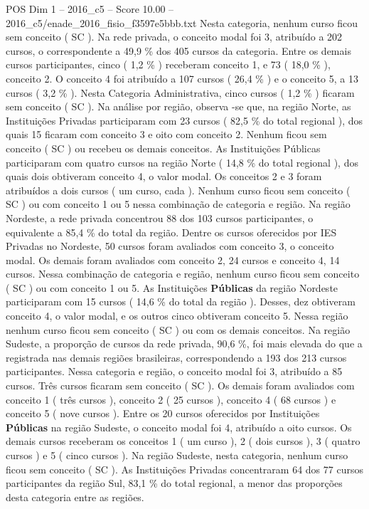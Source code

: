 \begin{textsample}{POS Dim 1 – 2016\_c5 – Score 10.00 – 2016\_c5/enade\_2016\_fisio\_f3597e5bbb.txt}
Nesta categoria, nenhum curso ficou sem conceito ( SC ).
Na rede privada, o conceito modal foi 3, atribuído a 202 cursos, o correspondente a 49,9 \% dos 405 cursos da categoria.
Entre os demais cursos participantes, cinco ( 1,2 \% ) receberam conceito 1, e 73 ( 18,0 \% ), conceito 2.
O conceito 4 foi atribuído a 107 cursos ( 26,4 \% ) e o conceito 5, a 13 cursos ( 3,2 \% ).
Nesta Categoria Administrativa, cinco cursos ( 1,2 \% ) ficaram sem conceito ( SC ).
Na análise por região, observa -se que, na região Norte, as Instituições Privadas participaram com 23 cursos ( 82,5 \% do total regional ), dos quais 15 ficaram com conceito 3 e oito com conceito 2.
Nenhum ficou sem conceito ( SC ) ou recebeu os demais conceitos.
As Instituições Públicas participaram com quatro cursos na região Norte ( 14,8 \% do total regional ), dos quais dois obtiveram conceito 4, o valor modal.
Os conceitos 2 e 3 foram atribuídos a dois cursos ( um curso, cada ).
Nenhum curso ficou sem conceito ( SC ) ou com conceito 1 ou 5 nessa combinação de categoria e região.
Na região Nordeste, a rede privada concentrou 88 dos 103 cursos participantes, o equivalente a 85,4 \% do total da região.
Dentre os cursos oferecidos por IES Privadas no Nordeste, 50 cursos foram avaliados com conceito 3, o conceito modal.
Os demais foram avaliados com conceito 2, 24 cursos e conceito 4, 14 cursos.
Nessa combinação de categoria e região, nenhum curso ficou sem conceito ( SC ) ou com conceito 1 ou 5.
As Instituições \textbf{Públicas} da região Nordeste participaram com 15 cursos ( 14,6 \% do total da região ).
Desses, dez obtiveram conceito 4, o valor modal, e os outros cinco obtiveram conceito 5.
Nessa região nenhum curso ficou sem conceito ( SC ) ou com os demais conceitos.
Na região Sudeste, a proporção de cursos da rede privada, 90,6 \%, foi mais elevada do que a registrada nas demais regiões brasileiras, correspondendo a 193 dos 213 cursos participantes.
Nessa categoria e região, o conceito modal foi 3, atribuído a 85 cursos.
Três cursos ficaram sem conceito ( SC ).
Os demais foram avaliados com conceito 1 ( três cursos ), conceito 2 ( 25 cursos ), conceito 4 ( 68 cursos ) e conceito 5 ( nove cursos ).
Entre os 20 cursos oferecidos por Instituições \textbf{Públicas} na região Sudeste, o conceito modal foi 4, atribuído a oito cursos.
Os demais cursos receberam os conceitos 1 ( um curso ), 2 ( dois cursos ), 3 ( quatro cursos ) e 5 ( cinco cursos ).
Na região Sudeste, nesta categoria, nenhum curso ficou sem conceito ( SC ).
As Instituições Privadas concentraram 64 dos 77 cursos participantes da região Sul, 83,1 \% do total regional, a menor das proporções desta categoria entre as regiões.

\end{textsample}
